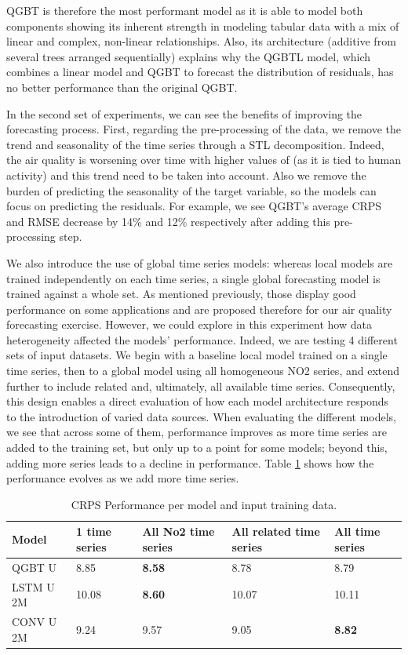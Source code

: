 \documentclass[12pt,a4paper]{book}
\begin{document}
QGBT is therefore the most performant model as it is able to model both components showing its inherent strength in modeling tabular data with a mix of linear and complex, non-linear relationships. Also, its architecture (additive from several trees arranged sequentially) explains why the QGBTL model, which combines a linear model and QGBT to forecast the distribution of residuals, has no better performance than the original QGBT.

In the second set of experiments, we can see the benefits of improving the forecasting process. First, regarding the pre-processing of the data, we remove the trend and seasonality of the time series through a STL decomposition. Indeed, the air quality is worsening over time with higher values of \no{} (as it is tied to human activity) and this trend need to be taken into account. Also we remove the burden of predicting the seasonality of the target variable, so the models can focus on predicting the residuals. For example, we see QGBT's average CRPS and RMSE decrease by 14\% and 12\% respectively after adding this pre-processing step.

We also introduce the use of global time series models: whereas local models are trained independently on each time series, a single global forecasting model is trained against a whole set. As mentioned previously, those display good performance on some applications and are proposed therefore for our air quality forecasting exercise. However, we could explore in this experiment how data heterogeneity affected the models’ performance. Indeed, we are testing 4 different sets of input datasets. We begin with a baseline local model trained on a single time series, then to a global model using all homogeneous NO2 series, and extend further to include related and, ultimately, all available time series. Consequently, this design enables a direct evaluation of how each model architecture responds to the introduction of varied data sources. When evaluating the different models, we see that across some of them, performance improves as more time series are added to the training set, but only up to a point for some models; beyond this, adding more series leads to a decline in performance. Table \ref{tab:exp2_perf_volume_data} shows how the performance evolves as we add more time series.


\begin{table}[h]
\centering

\begin{tabular}{lllll}
\toprule
Model & 1 time series & All No2 time series & All related time series & All time series \\
\midrule
QGBT U & 8.85 & \textbf{8.58} & 8.78 & 8.79 \\
LSTM U 2M & 10.08 & \textbf{8.60} & 10.07 & 10.11 \\
CONV U 2M & 9.24 & 9.57 & 9.05 & \textbf{8.82} \\
\bottomrule
\end{tabular}

\caption{ CRPS Performance per model and input training data. }
\label{tab:exp2_perf_volume_data}
\end{table}
\end{document}
